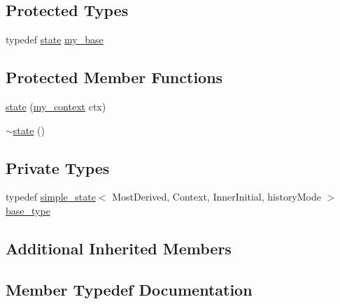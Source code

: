 \subsection*{Protected Types}
\begin{DoxyCompactItemize}
\item 
typedef \mbox{\hyperlink{classboost_1_1statechart_1_1state}{state}} \mbox{\hyperlink{classboost_1_1statechart_1_1state_a6a9cebd0c102585d9deeb1f4f6c8106e}{my\+\_\+base}}
\end{DoxyCompactItemize}
\subsection*{Protected Member Functions}
\begin{DoxyCompactItemize}
\item 
\mbox{\hyperlink{classboost_1_1statechart_1_1state_a5ce1b234749386623e483ce94911db4a}{state}} (\mbox{\hyperlink{structboost_1_1statechart_1_1state_1_1my__context}{my\+\_\+context}} ctx)
\item 
\mbox{\hyperlink{classboost_1_1statechart_1_1state_a24834f36d8be502d0afe56984e5b9c7d}{$\sim$state}} ()
\end{DoxyCompactItemize}
\subsection*{Private Types}
\begin{DoxyCompactItemize}
\item 
typedef \mbox{\hyperlink{classboost_1_1statechart_1_1simple__state}{simple\+\_\+state}}$<$ Most\+Derived, Context, Inner\+Initial, history\+Mode $>$ \mbox{\hyperlink{classboost_1_1statechart_1_1state_aadce17d9ee82244e16367d5a6b613b79}{base\+\_\+type}}
\end{DoxyCompactItemize}
\subsection*{Additional Inherited Members}


\subsection{Member Typedef Documentation}
\mbox{\label{classboost_1_1statechart_1_1state_aadce17d9ee82244e16367d5a6b613b79}} 
